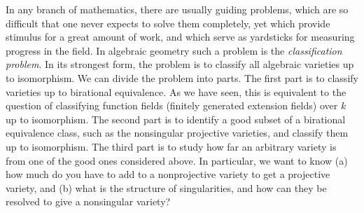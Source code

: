 {In any branch of mathematics, there are usually guiding problems, which are so difficult that one never expects to solve them completely, yet which provide stimulus for a great amount of work, and which serve as yardsticks for measuring progress in the field. In algebraic geometry such a problem is the \emph{classification problem}. In its strongest form, the problem is to classify all algebraic varieties up to isomorphism. We can divide the problem into parts. The first part is to classify varieties up to birational equivalence. As we have seen, this is equivalent to the question of classifying function fields (finitely generated extension fields) over $k$ up to isomorphism. The second part is to identify a good subset of a birational equivalence class, such as the nonsingular projective varieties, and classify them up to isomorphism. The third part is to study how far an arbitrary variety is from one of the good ones considered above. In particular, we want to know (a) how much do you have to add to a nonprojective variety to get a projective variety, and (b) what is the structure of singularities, and how can they be resolved to give a nonsingular variety?}

